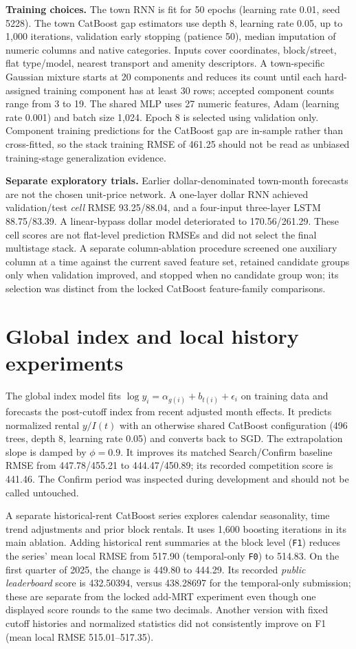\documentclass[10pt,a4paper]{article}
\begin{document}
\textbf{Training choices.} The town RNN is fit for 50 epochs (learning rate 0.01, seed 5228). The town CatBoost gap estimators use depth 8, learning rate 0.05, up to 1,000 iterations, validation early stopping (patience 50), median imputation of numeric columns and native categories. Inputs cover coordinates, block/street, flat type/model, nearest transport and amenity descriptors. A town-specific Gaussian mixture starts at 20 components and reduces its count until each hard-assigned training component has at least 30 rows; accepted component counts range from 3 to 19. The shared MLP uses 27 numeric features, Adam (learning rate 0.001) and batch size 1,024. Epoch 8 is selected using validation only. Component training predictions for the CatBoost gap are in-sample rather than cross-fitted, so the stack training RMSE of 461.25 should not be read as unbiased training-stage generalization evidence.

\textbf{Separate exploratory trials.} Earlier dollar-denominated town-month forecasts are not the chosen unit-price network. A one-layer dollar RNN achieved validation/test \emph{cell} RMSE 93.25/88.04, and a four-input three-layer LSTM 88.75/83.39. A linear-bypass dollar model deteriorated to 170.56/261.29. These cell scores are not flat-level prediction RMSEs and did not select the final multistage stack. A separate column-ablation procedure screened one auxiliary column at a time against the current saved feature set, retained candidate groups only when validation improved, and stopped when no candidate group won; its selection was distinct from the locked CatBoost feature-family comparisons.

\section{Global index and local history experiments}\label{app:time}
The global index model fits $\log y_i=\alpha_{g(i)}+b_{t(i)}+\epsilon_i$ on training data and forecasts the post-cutoff index from recent adjusted month effects. It predicts normalized rental $y/I(t)$ with an otherwise shared CatBoost configuration (496 trees, depth 8, learning rate 0.05) and converts back to SGD. The extrapolation slope is damped by $\phi=0.9$. It improves its matched Search/Confirm baseline RMSE from 447.78/455.21 to 444.47/450.89; its recorded competition score is 441.46. The Confirm period was inspected during development and should not be called untouched.

A separate historical-rent CatBoost series explores calendar seasonality, time trend adjustments and prior block rentals. It uses 1,600 boosting iterations in its main ablation. Adding historical rent summaries at the block level (\texttt{F1}) reduces the series' mean local RMSE from 517.90 (temporal-only \texttt{F0}) to 514.83. On the first quarter of 2025, the change is 449.80 to 444.29. Its recorded \emph{public leaderboard} score is 432.50394, versus 438.28697 for the temporal-only submission; these are separate from the locked add-MRT experiment even though one displayed score rounds to the same two decimals. Another version with fixed cutoff histories and normalized statistics did not consistently improve on F1 (mean local RMSE 515.01--517.35).
\end{document}
